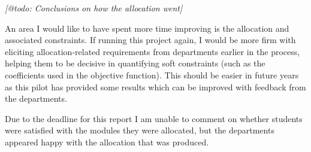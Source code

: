 \emph{[@todo: Conclusions on how the allocation went]}


An area I would like to have spent more time improving is the allocation and
associated constraints. If running this project again, I would be more firm
with eliciting allocation-related requirements from departments earlier in the
process, helping them to be decisive in quantifying soft constraints (such as
the coefficients used in the objective function). This should be easier in
future years as this pilot has provided some results which can be improved
with feedback from the departments.

Due to the deadline for this report I am unable to comment on whether students
were satisfied with the modules they were allocated, but the departments
appeared happy with the allocation that was produced.
